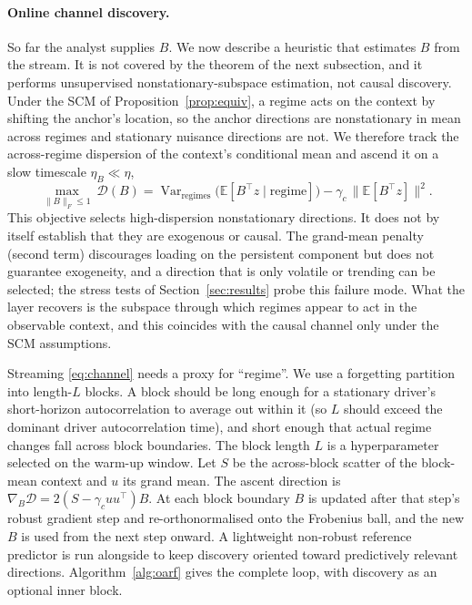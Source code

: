 \documentclass[11pt]{article}
\theoremstyle{plain}
\theoremstyle{remark}
\newcommand{\E}{\mathbb{E}}
\DeclareMathOperator*{\Var}{Var}
\begin{document}
\paragraph{Online channel discovery.}
So far the analyst supplies $B$. We now describe a heuristic that estimates $B$ from
the stream. It is not covered by the theorem of the next subsection, and it performs
unsupervised nonstationary-subspace estimation, not causal discovery. Under the SCM of
Proposition~\ref{prop:equiv}, a regime acts on the context by shifting the anchor's
location, so the anchor directions are nonstationary in mean across regimes and
stationary nuisance directions are not. We therefore track the across-regime
dispersion of the context's conditional mean and ascend it on a slow timescale
$\eta_B\ll\eta$,
\begin{equation}\label{eq:channel}
\max_{\|B\|_F\le 1}\ \mathcal{D}(B)=\Var_{\text{regimes}}\!\big(\E[B^\top z\mid\text{regime}]\big)
 -\gamma_c\,\big\|\E[B^\top z]\big\|^2 .
\end{equation}
This objective selects high-dispersion nonstationary directions. It does not by itself
establish that they are exogenous or causal. The grand-mean penalty (second term)
discourages loading on the persistent component but does not guarantee exogeneity,
and a direction that is only volatile or trending can be selected; the stress tests of
Section~\ref{sec:results} probe this failure mode. What the layer recovers is the
subspace through which regimes appear to act in the observable context, and this
coincides with the causal channel only under the SCM assumptions.

Streaming \eqref{eq:channel} needs a proxy for ``regime''. We use a forgetting
partition into length-$L$ blocks. A block should be long enough for a stationary
driver's short-horizon autocorrelation to average out within it (so $L$ should exceed
the dominant driver autocorrelation time), and short enough that actual regime changes
fall across block boundaries. The block length $L$ is a hyperparameter selected on the warm-up window. Let $S$ be
the across-block scatter of the block-mean context and $u$ its grand mean. The ascent
direction is $\nabla_B\mathcal{D}=2(S-\gamma_c uu^\top)B$. At each block boundary $B$
is updated after that step's robust gradient step and re-orthonormalised onto the
Frobenius ball, and the new $B$ is used from the next step onward. A lightweight
non-robust reference predictor is run alongside to keep discovery oriented toward
predictively relevant directions. Algorithm~\ref{alg:oarf} gives the complete loop,
with discovery as an optional inner block.
\end{document}
